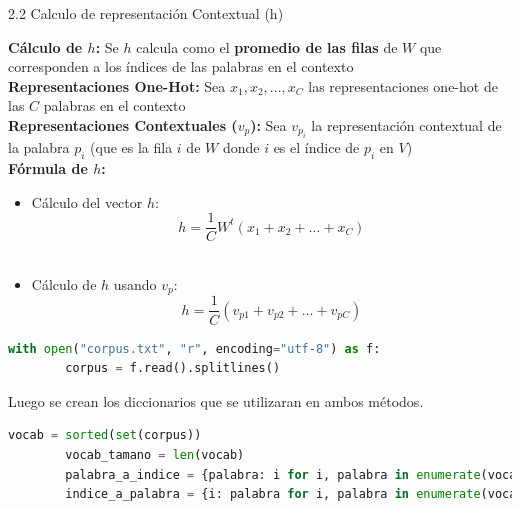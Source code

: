 \documentclass{beamer}
\begin{document}
\begin{frame}[fragile]{2.2 Calculo de representación Contextual (h)}

		\justifying
		\textbf{Cálculo de $h$:} Se $h$ calcula como el \textbf{promedio de las filas} de $W$ que corresponden a los índices de las palabras en el contexto\\
		\vspace{0.1cm}
		\textbf{Representaciones One-Hot:}  Sea $x_1, x_2, ..., x_C$ las representaciones one-hot de las $C$ palabras en el contexto\\
		\vspace{0.1cm}
		\textbf{Representaciones Contextuales ($v_p$):} Sea $v_{p_i}$ la representación contextual de la palabra $p_i$ (que es la fila $i$ de $W$ donde $i$ es el índice de $p_i$ en $V$) \\
		\vspace{0.1cm}
		\textbf{Fórmula de $h$:} 						\\
		\begin{itemize}
			\item Cálculo del vector $h$: 	
			$$h = \frac{1}{C} W^t(x_1 + x_2 + \dots + x_C)$$\\
			\item Cálculo de $h$ usando $v_p$:
			 $$h = \frac{1}{C} (v_{p1} + v_{p2} + \dots + v_{pC})$$
		\end{itemize}
	\begin{lstlisting}[language=Python]
		with open("corpus.txt", "r", encoding="utf-8") as f:
		corpus = f.read().splitlines()
	\end{lstlisting}
	Luego se crean los diccionarios que se utilizaran en ambos métodos.
	\begin{lstlisting}[language=Python]
		vocab = sorted(set(corpus))
		vocab_tamano = len(vocab)
		palabra_a_indice = {palabra: i for i, palabra in enumerate(vocab)}
		indice_a_palabra = {i: palabra for i, palabra in enumerate(vocab)}
	\end{lstlisting}
	
\end{frame}
\end{document}
